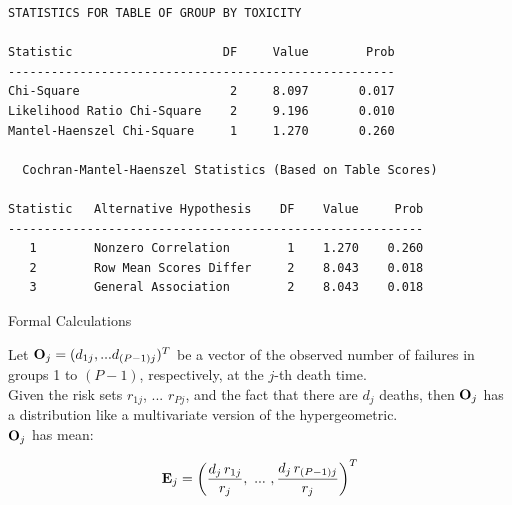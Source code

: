 \documentclass[envcountsect, 10pt, portrait, palatino]{beamer}
\begin{document}
\begin{frame}[fragile]

\scriptsize
\begin{verbatim}
STATISTICS FOR TABLE OF GROUP BY TOXICITY

Statistic                     DF     Value        Prob
------------------------------------------------------
Chi-Square                     2     8.097       0.017
Likelihood Ratio Chi-Square    2     9.196       0.010
Mantel-Haenszel Chi-Square     1     1.270       0.260

  Cochran-Mantel-Haenszel Statistics (Based on Table Scores)

Statistic   Alternative Hypothesis    DF    Value     Prob
----------------------------------------------------------
   1        Nonzero Correlation        1    1.270    0.260
   2        Row Mean Scores Differ     2    8.043    0.018
   3        General Association        2    8.043    0.018
\end{verbatim}
\end{frame}

\begin{frame}{Formal Calculations}

Let ${\bf O}_j = (d_{1j},...d_{(P-1)j})^T$ be a vector
of the observed number of failures in groups 1 to $(P-1)$,
respectively, at the $j$-th death time. \\[2ex]
Given the risk sets $r_{1j}$, ... $r_{Pj}$, and the fact that there are
$d_j$ deaths, then ${\bf O}_j$ has a distribution like a
multivariate version of the hypergeometric.  \\[2ex]

${\bf O}_j$ has mean:

\[   {\bf E}_j =\left (\frac{d_{j}\, r_{1j}}{r_j},~...~,
\frac{d_{j} \, r_{(P-1)j}}{r_j}\right )^T \]
\end{frame}
\end{document}
